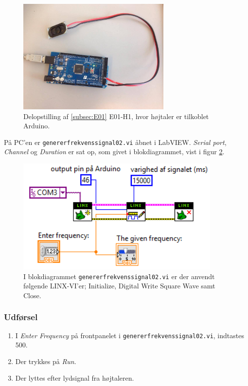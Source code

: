 			\begin{figure}[htb]
			\centering
				\includegraphics[width=3in]{haArduino}
				\caption{Delopstilling af \ref{subsec:E01} E01-H1, hvor højtaler er tilkoblet Arduino.}	
				\label{fig:E01}
			\end{figure}
	
		På PC'en er \texttt{genererfrekvenssignal02.vi} åbnet i LabVIEW. \textit{Serial port}, \textit{Channel} og \textit{Duration} er sat op, som givet i blokdiagrammet, vist i figur \ref{fig:bdgenerer}.   \\   
	
			\begin{figure}[htb]
			\centering
				\includegraphics[width=4in]{genererfrekvenssignal02}
				\caption{I blokdiagrammet \texttt{genererfrekvenssignal02.vi} er der anvendt følgende LINX-VI'er; Initialize, Digital Write Square Wave samt Close.}	
				\label{fig:bdgenerer}
			\end{figure}	  
	
		\subsubsection{Udførsel}
			\begin{enumerate} 
				\item I \textit{Enter Frequency} på frontpanelet i \texttt{genererfrekvenssignal02.vi}, indtastes 500. 
				\item Der trykkes på \textit{Run}. 
				\item Der lyttes efter lydsignal fra højtaleren.  
			\end{enumerate}
			
